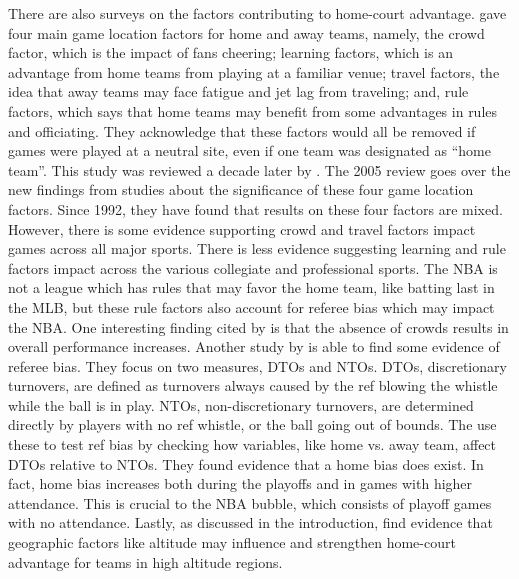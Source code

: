 \documentclass[10pt]{article}
\begin{document}
There are also surveys on the factors contributing to home-court advantage.
\citet{Carron1992} gave four main game location factors for home and away
teams, namely, the crowd factor, which is the impact of fans cheering; learning
factors, which is an advantage from home teams from playing at
a familiar venue; travel factors, the idea that away teams may face
fatigue and jet lag from traveling; and, rule factors, which says that home teams
may benefit from some advantages in rules and officiating. They acknowledge that
these factors would all be removed if games were played at a neutral site, even
if one team was designated as ``home team''. This study was reviewed a decade later
by \citet{Carron2005}. The 2005 review goes over the new findings from studies
about the significance of these four game location factors. Since 1992, they have found
that results on these four factors are mixed. However, there is some evidence
supporting crowd and travel factors impact games across all major sports. There is less
evidence suggesting learning and rule factors impact across the various collegiate 
and professional sports. The NBA is not a league which has rules that
may favor the home team, like batting last in the MLB, but these rule
factors also account for referee bias which may impact the NBA.  One
interesting finding cited by \citet{Carron2005} is that the absence of crowds results
in overall performance increases. Another study by \citet{Price} is able 
to find some evidence of referee bias. They focus on two measures, DTOs and NTOs.
DTOs, discretionary turnovers, are defined as turnovers always caused by the ref
blowing the whistle while the ball is in play. NTOs, non-discretionary turnovers, 
are determined directly by players with no ref whistle, or the ball going out of
bounds. The use these to test ref bias by checking how variables, like home vs. away
team, affect DTOs relative to NTOs. They found evidence that a home bias does exist. 
In fact, home bias increases both during the playoffs and in games with higher attendance.
This is crucial to the NBA bubble, which consists of playoff games with no attendance. 
Lastly, as discussed in the introduction, \citet{Lopez}
find evidence that geographic factors like altitude may influence and strengthen home-court
advantage for teams in high altitude regions.
\end{document}
